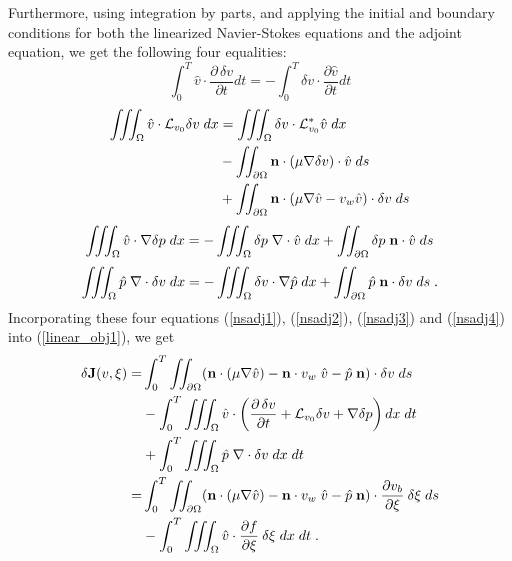 Furthermore, using integration by parts, and applying the initial and boundary
conditions for both the linearized Navier-Stokes equations and the adjoint
equation, we get the following four equalities:
\begin{equation} \label{nsadj5}
   \int_0^T {\hat v} \cdot \frac{\partial\, \delta v}{\partial t} dt
 = - \int_0^T \delta v \cdot \frac{\partial {\hat v}}{\partial t} dt
\end{equation}
\begin{equation} \label{nsadj6} \begin{split}
   \iiint_\Omega {\hat v} \cdot {\mathcal L}_{v_0} \delta v\; dx
 &= \iiint_\Omega \delta v \cdot {\mathcal L}_{v_0}^* {\hat v}\; dx \\
 &- \iint_{\partial\Omega}
   {\bf n} \cdot (\mu \nabla \delta v) \cdot {\hat v}\; ds \\
 &+ \iint_{\partial\Omega}
   {\bf n} \cdot (\mu \nabla {\hat v} - v_w{\hat v}) \cdot \delta v\; ds
\end{split} \end{equation}
\begin{equation} \label{nsadj7}
   \iiint_\Omega {\hat v} \cdot \nabla \delta p\; dx
 = - \iiint_\Omega \delta p\; \nabla \cdot {\hat v}\; dx
 + \iint_{\partial\Omega} \delta p\; {\bf n}\cdot {\hat v} \; ds
\end{equation}
\begin{equation} \label{nsadj8}
   \iiint_\Omega {\hat p}\; \nabla \cdot \delta v\; dx
 = - \iiint_\Omega \delta v \cdot \nabla {\hat p}\; dx
 + \iint_{\partial\Omega} {\hat p}\; {\bf n}\cdot \delta v\; ds \;.
\end{equation}
Incorporating these four equations
(\ref{nsadj1}), (\ref{nsadj2}), (\ref{nsadj3}) and (\ref{nsadj4}) into
(\ref{linear_obj1}), we get
\[ \begin{split}
   \delta {\bf J}(v,\xi) =&
   \int_0^T \iint_{\partial\Omega} ( {\bf n} \cdot (\mu \nabla {\hat v}) -
   {\bf n} \cdot v_w\; {\hat v} - {\hat p}\; {\bf n} )\cdot \delta v\; ds \\
   &- \int_0^T \iiint_\Omega {\hat v} \cdot
      \left( \frac{\partial \,\delta v}{\partial t}
        + \mathcal{L}_{v_0} \delta v
        + \nabla \delta p \right) dx\;dt \\
   &+ \int_0^T \iiint_\Omega {\hat p} \; \nabla \cdot \delta v\; dx\;dt \\
   =& \int_0^T \iint_{\partial\Omega} ( {\bf n} \cdot (\mu \nabla {\hat v}) -
   {\bf n} \cdot v_w\; {\hat v} - {\hat p}\; {\bf n} )\cdot
   \frac{\partial v_b}{\partial \xi} \:\delta \xi \; ds  \\
   &- \int_0^T \iiint_\Omega {\hat v} \cdot \frac{\partial f}{\partial\xi} \:
     \delta \xi\; dx\;dt \;.
\end{split} \]

